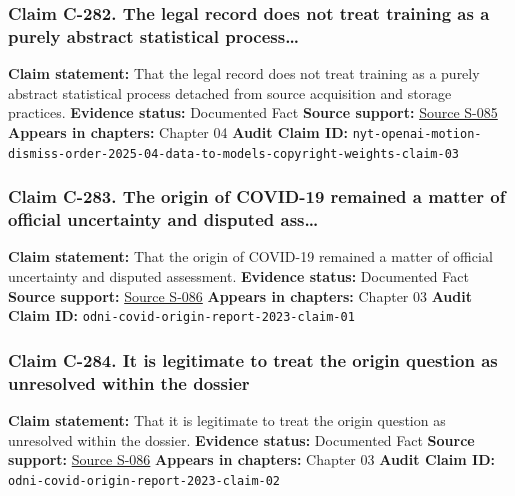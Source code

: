 \documentclass[
  american,
  11pt,
  letterpaper,
]{article}
\begin{document}
\subsubsection{Claim C-282. The legal record does not treat training as
a purely abstract statistical
process\ldots{}}\label{claim-c-282-the-legal-record-does-not-treat-training-as-a-purely-abstract-statistical-process}

\textbf{Claim statement:} That the legal record does not treat training
as a purely abstract statistical process detached from source
acquisition and storage practices. \textbf{Evidence status:} Documented
Fact \textbf{Source support:}
\hyperref[source-s-085-the-new-york-times-company-v-microsoft-corporation-et-al-opinion-on-motions-to-dismiss]{Source
S-085} \textbf{Appears in chapters:} Chapter 04 \textbf{Audit Claim ID:}
\texttt{nyt-openai-motion-dismiss-order-2025-04-data-to-models-copyright-weights-claim-03}

\subsubsection{Claim C-283. The origin of COVID-19 remained a matter of
official uncertainty and disputed
ass\ldots{}}\label{claim-c-283-the-origin-of-covid-19-remained-a-matter-of-official-uncertainty-and-disputed-ass}

\textbf{Claim statement:} That the origin of COVID-19 remained a matter
of official uncertainty and disputed assessment. \textbf{Evidence
status:} Documented Fact \textbf{Source support:}
\hyperref[source-s-086-report-on-potential-links-between-the-wuhan-institute-of-virology-and-the-origins-of-covid-19]{Source
S-086} \textbf{Appears in chapters:} Chapter 03 \textbf{Audit Claim ID:}
\texttt{odni-covid-origin-report-2023-claim-01}

\subsubsection{Claim C-284. It is legitimate to treat the origin
question as unresolved within the
dossier}\label{claim-c-284-it-is-legitimate-to-treat-the-origin-question-as-unresolved-within-the-dossier}

\textbf{Claim statement:} That it is legitimate to treat the origin
question as unresolved within the dossier. \textbf{Evidence status:}
Documented Fact \textbf{Source support:}
\hyperref[source-s-086-report-on-potential-links-between-the-wuhan-institute-of-virology-and-the-origins-of-covid-19]{Source
S-086} \textbf{Appears in chapters:} Chapter 03 \textbf{Audit Claim ID:}
\texttt{odni-covid-origin-report-2023-claim-02}
\end{document}
